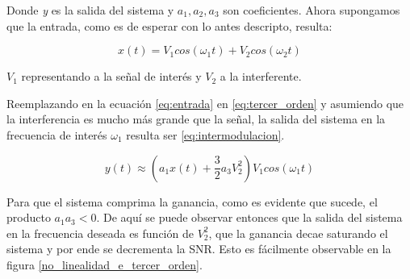 Donde \emph{y} es la salida del sistema y \(a_1, a_2, a_3 \) son coeficientes. Ahora supongamos que la entrada, como es de esperar con lo antes
descripto, resulta:

\begin{equation}\label{eq:entrada}
    x(t)=V_1 cos(\omega_1 t)+ V_2 cos(\omega_2 t)
\end{equation}

\(V_1\) representando a la señal de interés y \(V_2\) a la interferente.\par
Reemplazando en la ecuación \ref{eq:entrada} en \ref{eq:tercer_orden} y asumiendo que la interferencia es mucho más grande que la señal, 
la salida del sistema en la frecuencia de interés \(\omega_1\) resulta ser \ref{eq:intermodulacion}.

\begin{equation}\label{eq:intermodulacion}
    y(t) \approx \left( a_1 x(t) + \frac{3}{2} a_3 V_2^{2} \right) V_1  cos(\omega_1 t)
\end{equation}

Para que el sistema comprima la ganancia, como es evidente que sucede, el producto \(a_1 a_3 < 0\). De aquí se puede observar entonces que
la salida del sistema en la frecuencia deseada es función de \(V_2^{2}\), que la ganancia decae saturando el sistema y por ende se decrementa 
la SNR. Esto es fácilmente observable en la figura \ref{no_linealidad_e_tercer_orden}.

